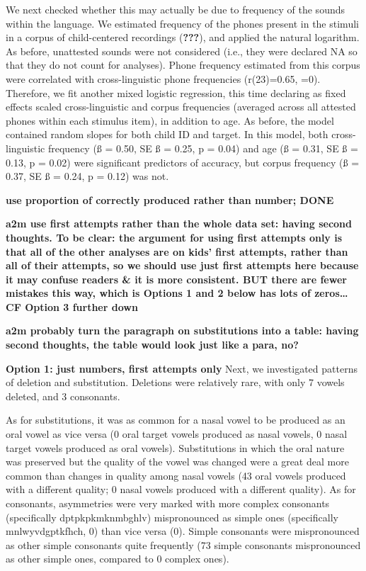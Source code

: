 \documentclass[english,,man,floatsintext]{apa6}
\begin{document}
We next checked whether this may actually be due to frequency of the sounds within the language. We estimated frequency of the phones present in the stimuli in a corpus of child-centered recordings ({\textbf{???}}), and applied the natural logarithm. As before, unattested sounds were not considered (i.e., they were declared NA so that they do not count for analyses). Phone frequency estimated from this corpus were correlated with cross-linguistic phone frequencies (r(23)=0.65, =0). Therefore, we fit another mixed logistic regression, this time declaring as fixed effects scaled cross-linguistic and corpus frequencies (averaged across all attested phones within each stimulus item), in addition to age. As before, the model contained random slopes for both child ID and target. In this model, both cross-linguistic frequency (ß = 0.50, SE ß = 0.25, p = 0.04) and age (ß = 0.31, SE ß = 0.13, p = 0.02) were significant predictors of accuracy, but corpus frequency (ß = 0.37, SE ß = 0.24, p = 0.12) was not.

\textbf{use proportion of correctly produced rather than number; DONE}

\textbf{a2m use first attempts rather than the whole data set: having second thoughts. To be clear: the argument for using first attempts only is that all of the other analyses are on kids' first attempts, rather than all of their attempts, so we should use just first attempts here because it may confuse readers \& it is more consistent. BUT there are fewer mistakes this way, which is Options 1 and 2 below has lots of zeros\ldots{} CF Option 3 further down}

\textbf{a2m probably turn the paragraph on substitutions into a table: having second thoughts, the table would look just like a para, no?}

\textbf{Option 1: just numbers, first attempts only }
Next, we investigated patterns of deletion and substitution. Deletions were relatively rare, with only 7 vowels deleted, and 3 consonants.

As for substitutions, it was as common for a nasal vowel to be produced as an oral vowel as vice versa (0 oral target vowels produced as nasal vowels, 0 nasal target vowels produced as oral vowels). Substitutions in which the oral nature was preserved but the quality of the vowel was changed were a great deal more common than changes in quality among nasal vowels (43 oral vowels produced with a different quality; 0 nasal vowels produced with a different quality). As for consonants, asymmetries were very marked with more complex consonants (specifically dptpkpkmknmbghlv) mispronounced as simple ones (specifically mnlwyvdgptkfhch, 0) than vice versa (0). Simple consonants were mispronounced as other simple consonants quite frequently (73 simple consonants mispronounced as other simple ones, compared to 0 complex ones).
\end{document}
